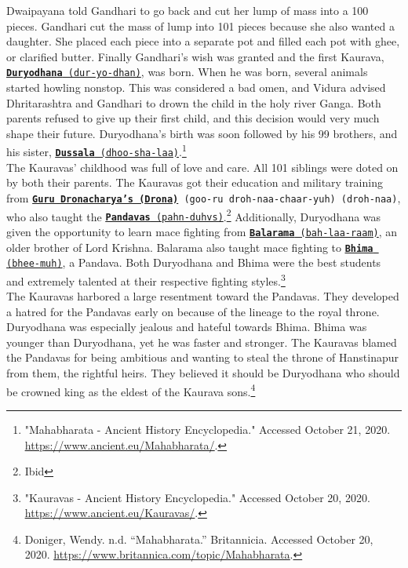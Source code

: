 \documentclass[10pt, letterpaper]{article}
\begin{document}
Dwaipayana told Gandhari to go back and cut her lump of mass into a 100
pieces. Gandhari cut the mass of lump into 101 pieces because she also
wanted a daughter. She placed each piece into a separate pot and filled
each pot with ghee, or clarified butter. Finally Gandhari's wish was
granted and the first Kaurava,
\texttt{\underline{\href{https://drive.google.com/file/d/1nwSSBrQIJ-UQO-p-WC-Bg4Z1qNjTfhZM/view?usp=sharing}{\textbf{Duryodhana}}
(dur-yo-dhan)}}, was born. When he was born, several animals started
howling nonstop. This was considered a bad omen, and Vidura advised
Dhritarashtra and Gandhari to drown the child in the holy river Ganga.
Both parents refused to give up their first child, and this decision
would very much shape their future. Duryodhana's birth was soon followed
by his 99 brothers, and his sister,
\texttt{\underline{\href{https://drive.google.com/file/d/1Gkniqa3c5mc059Q6FvZy0ePza_KB-ley/view?usp=sharing}{\textbf{Dussala}}
(dhoo-sha-laa)}}.\footnote{"Mahabharata - Ancient History Encyclopedia."
  Accessed October 21, 2020.
  \href{https://www.ancient.eu/Mahabharata/}{\underline{https://www.ancient.eu/Mahabharata/}}.} \\

The Kauravas' childhood was full of love and care. All 101 siblings were
doted on by both their parents. The Kauravas got their education and
military training from
\texttt{{\href{https://drive.google.com/file/d/1GKVU-TaPGP4vNyE8pDSzUfNHyKCW4HNQ/view?usp=sharing}{\textbf{Guru
Dronacharya's (Drona)}} (goo-ru droh-naa-chaar-yuh) (droh-naa)}}, who
also taught the
\texttt{\underline{\href{https://drive.google.com/file/d/1Y0e1yo3w49t4CobFlTryZT7ixmMI-Afd/view?usp=sharing}{\textbf{Pandavas}}
(pahn-duhvs)}}.\footnote{Ibid} Additionally, Duryodhana was given the
opportunity to learn mace fighting from
\texttt{\underline{\href{https://drive.google.com/file/d/1L1LAcxF9GZlhvnOF1qFWHk4IXZza3IzJ/view?usp=sharing}{\textbf{Balarama}}
(bah-laa-raam)}}, an older brother of Lord Krishna. Balarama also taught
mace fighting to
\texttt{\underline{\href{https://drive.google.com/file/d/1dqTu2tLHafrNZbKqC5MUVBXEptNpt2K7/view?usp=sharing}{\textbf{Bhima}}
(bhee-muh)}}, a Pandava. Both Duryodhana and Bhima were the best students
and extremely talented at their respective fighting styles.\footnote{"Kauravas
  - Ancient History Encyclopedia." Accessed October 20, 2020.
  \href{https://www.ancient.eu/Kauravas/}{\underline{https://www.ancient.eu/Kauravas/}}.} \\

The Kauravas harbored a large resentment toward the Pandavas. They
developed a hatred for the Pandavas early on because of the lineage to
the royal throne. Duryodhana was especially jealous and hateful towards
Bhima. Bhima was younger than Duryodhana, yet he was faster and
stronger. The Kauravas blamed the Pandavas for being ambitious and
wanting to steal the throne of Hanstinapur from them, the rightful
heirs. They believed it should be Duryodhana who should be crowned king
as the eldest of the Kaurava sons.\footnote{Doniger, Wendy. n.d.
  ``Mahabharata.'' Britannicia. Accessed October 20, 2020.
  \href{https://www.britannica.com/topic/Mahabharata}{\underline{https://www.britannica.com/topic/Mahabharata}}.} \\
\end{document}
